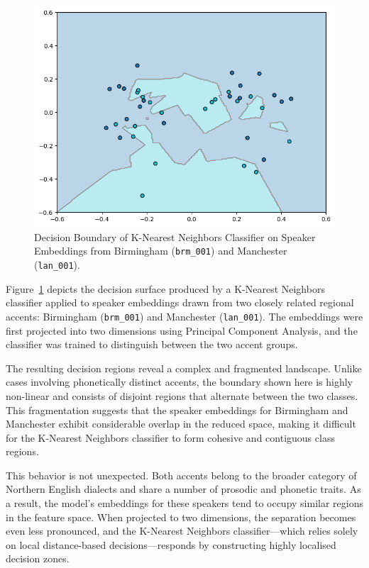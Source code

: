 \documentclass[conference]{IEEEtran}
\begin{document}
	\begin{figure}[h]
		\centering
		\includegraphics[width=0.7\linewidth]{img/img-knn-brm-lan.png}
		\caption{Decision Boundary of K-Nearest Neighbors Classifier on Speaker Embeddings from Birmingham (\texttt{brm\_001}) and Manchester (\texttt{lan\_001}).}
		\label{fig:knn-brm-lan}
	\end{figure}
	
	
	Figure~\ref{fig:knn-brm-lan} depicts the decision surface produced by a K-Nearest Neighbors classifier applied to speaker embeddings drawn from two closely related regional accents: Birmingham (\texttt{brm\_001}) and Manchester (\texttt{lan\_001}). The embeddings were first projected into two dimensions using Principal Component Analysis, and the classifier was trained to distinguish between the two accent groups.
	
	The resulting decision regions reveal a complex and fragmented landscape. Unlike cases involving phonetically distinct accents, the boundary shown here is highly non-linear and consists of disjoint regions that alternate between the two classes. This fragmentation suggests that the speaker embeddings for Birmingham and Manchester exhibit considerable overlap in the reduced space, making it difficult for the K-Nearest Neighbors classifier to form cohesive and contiguous class regions.
	
	This behavior is not unexpected. Both accents belong to the broader category of Northern English dialects and share a number of prosodic and phonetic traits. As a result, the model's embeddings for these speakers tend to occupy similar regions in the feature space. When projected to two dimensions, the separation becomes even less pronounced, and the K-Nearest Neighbors classifier—which relies solely on local distance-based decisions—responds by constructing highly localised decision zones.
	
\end{document}
